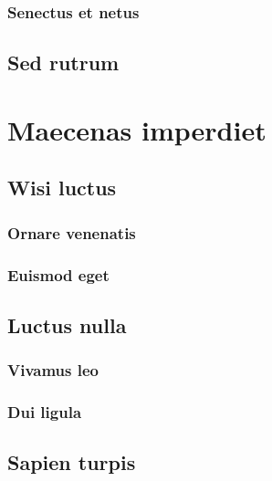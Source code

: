 \subsubsection{Senectus et netus} \lipsum[10]
\subsection{Sed rutrum} \lipsum[11-12]

\section{Maecenas imperdiet} \lipsum[13-14]
\subsection{Wisi luctus} \lipsum[15]
\subsubsection{Ornare venenatis} \lipsum[16]
\subsubsection{Euismod eget} \lipsum[17]
\subsection{Luctus nulla} \lipsum [18]
\subsubsection{Vivamus leo} \lipsum[19]
\subsubsection{Dui ligula} \lipsum[20]
\subsection{Sapien turpis} \lipsum [21-22]
